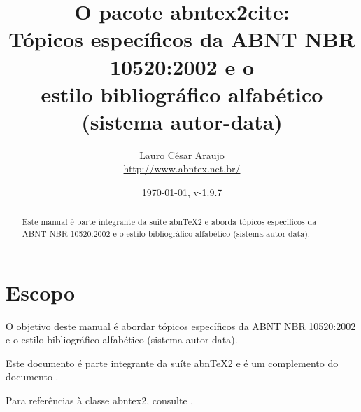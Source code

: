 \documentclass[a4paper]{ltxdoc}
\begin{document}
\nocite{santos1994}
\nocite{secretaria1999} %
\nocite{redes1995}
\nocite{makau1962} %

\newcommand{\titulo}{\textbf{O pacote \textsf{abntex2cite}}:\\ \Large{Tópicos
específicos da ABNT NBR 10520:2002 e o \\ estilo bibliográfico alfabético
(sistema autor-data)}}

\newcommand{\abnTeX}{abn\TeX}
\newcommand{\abnTeXSite}{\url{http://www.abntex.net.br/}}
\newcommand{\optiondefaultval}[1]{\underline{\texttt{#1}}}

\title{\titulo}
\author{ 
Lauro César Araujo\\\abnTeXSite}
\date{\today, v-1.9.7}

\maketitle


\begin{abstract}
Este manual é parte integrante da suíte \abnTeX2 e aborda tópicos específicos
da ABNT NBR 10520:2002 e o estilo bibliográfico alfabético (sistema
autor-data).
\end{abstract}


\tableofcontents

\listoftables

\section{Escopo}

O objetivo deste manual é abordar tópicos específicos da ABNT NBR 10520:2002 e
o estilo bibliográfico alfabético (sistema autor-data). 

Este documento é parte integrante da suíte \abnTeX2 e é um complemento do
documento .

Para referências à classe \textsf{abntex2}, consulte .
\end{document}
